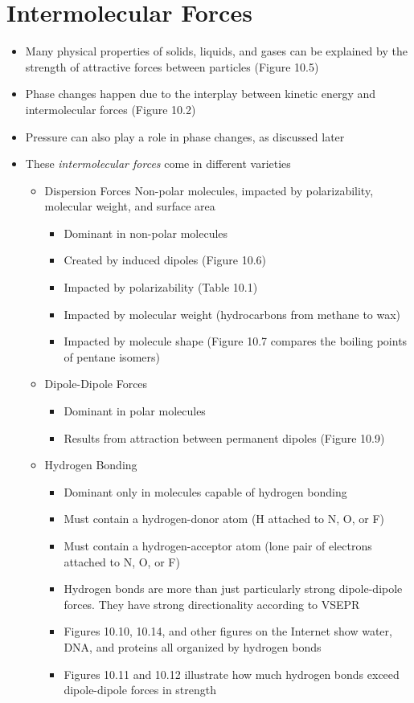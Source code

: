 \documentclass[12pt, openany, letterpaper]{memoir}
\begin{document}
\section{Intermolecular Forces}
\begin{itemize}
  \item Many physical properties of solids, liquids, and gases can be explained by the strength of attractive forces between particles (Figure 10.5)
  \item Phase changes happen due to the interplay between kinetic energy and intermolecular forces (Figure 10.2)
  \item Pressure can also play a role in phase changes, as discussed later
  \item These \emph{intermolecular forces} come in different varieties
  \begin{itemize}
    \item Dispersion Forces Non-polar molecules, impacted by polarizability, molecular weight, and surface area
    \begin{itemize}
      \item Dominant in non-polar molecules
      \item Created by induced dipoles (Figure 10.6)
      \item Impacted by polarizability (Table 10.1)
      \item Impacted by molecular weight (hydrocarbons from methane to wax)
      \item Impacted by molecule shape (Figure 10.7 compares the boiling points of pentane isomers)
    \end{itemize}
    \item Dipole-Dipole Forces
    \begin{itemize}
      \item Dominant in polar molecules
      \item Results from attraction between permanent dipoles (Figure 10.9)
    \end{itemize}
  \item Hydrogen Bonding
    \begin{itemize}
      \item Dominant only in molecules capable of hydrogen bonding
      \item Must contain a hydrogen-donor atom (H attached to N, O, or F)
      \item Must contain a hydrogen-acceptor atom (lone pair of electrons attached to N, O, or F)
      \item Hydrogen bonds are more than just particularly strong dipole-dipole forces. They have strong directionality according to VSEPR
      \item Figures 10.10, 10.14, and other figures on the Internet show water, DNA, and proteins all organized by hydrogen bonds
      \item Figures 10.11 and 10.12 illustrate how much hydrogen bonds exceed dipole-dipole forces in strength
    \end{itemize}
  \end{itemize}
\end{itemize}
\end{document}

